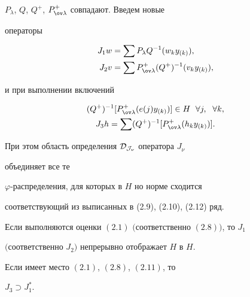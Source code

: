 $P_\lambda$, $Q$, $Q^+$, $P^+_{\ov\lambda}$ совпадают. Введем новые 


операторы 


\begin{align} 


J_1w&=\sum P_\lambda Q^{-1}(w_k y_{(k)}),\\ 


J_2v&=\sum P^+_{\ov\lambda}(Q^+)^{-1}(v_k y_{(k)}), 


\end{align} 


и при выполнении включений 


\begin{gather} 


(Q^+)^{-1}[P^+_{\ov\lambda}(e(j)y_{(k)})]\in H 


\ \;\forall j,\ \;\forall k, \\ 


J_3h=\sum(Q^+)^{-1}[P^+_{\ov\lambda}(h_k y_{(k)})]. 


\end{gather} 


При этом область определения $\cal D_{J_\nu}$ оператора $J_\nu$ 


объединяет все те 


$\varphi$-распределения, для которых в $H$ но норме сходится 


соответствующий из выписанных в (2.9), (2.10), (2.12) ряд. 


 


\begin{lems} 


Если выполняются оценки $(2.1)$ $($соответственно $(2.8))$, то $J_1$ 


$($соответствен\-но $J_2)$ непрерывно отображает $H$ в $H$. 


\end{lems} 


 


\begin{lems} 


Если имеет место $(2.1)$, $(2.8)$, $(2.11)$, то 


$J_3\supset J^*_1$. 


\end{lems} 


 


